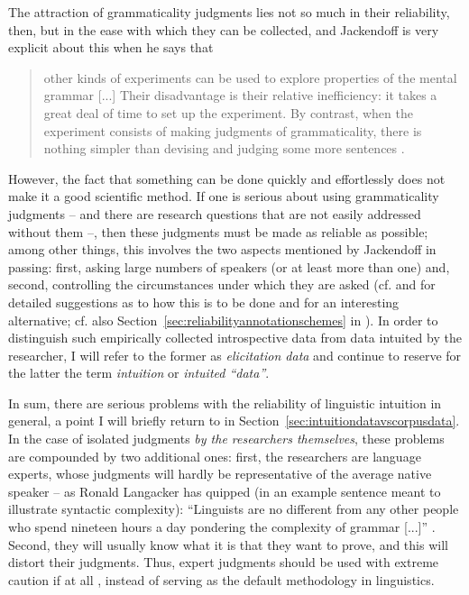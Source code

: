 The attraction of grammaticality judgments lies not so much in their reliability,  then, but in the ease with which they can be collected, and Jackendoff is very explicit about this when he says that

\begin{quote}
other kinds of experiments  can be used to explore properties of the mental grammar [...] Their disadvantage is their relative inefficiency: it takes a great deal of time to set up the experiment. By contrast, when the experiment consists of making judgments of grammaticality, there is nothing simpler than devising and judging some more sentences \citep[49]{jackendoff_patterns_1994}.
\end{quote}

However, the fact that something can be done quickly and effortlessly does not make it a good scientific method. If one is serious about using grammaticality  judgments -- and there are research questions that are not easily addressed without them --, then these judgments must be made as reliable  as possible; among other things, this involves the two aspects mentioned by Jackendoff in passing: first, asking large numbers of speakers (or at least more than one) and, second, controlling the circumstances under which they are asked (cf. \citealt{schutze_empirical_1996} and \citealt{cowart_experimental_1997} for detailed suggestions as to how this is to be done and \citealt{bender_boundaries_2005} for an interesting alternative; cf. also Section~\ref{sec:reliabilityannotationschemes} in ). In order to distinguish such empirically collected introspective  data from data intuited  by the researcher, I will refer to the former as \emph{elicitation  data} and continue to reserve for the latter the term \emph{intuition} or \emph{intuited ``data''}.

In sum, there are serious problems with the reliability  of linguistic intuition  in general, a point I will briefly return to in Section~\ref{sec:intuitiondatavscorpusdata}. In the case of isolated judgments \emph{by the researchers themselves}, these problems are compounded by two additional ones: first, the researchers are language experts, whose judgments will hardly be representative  of the average native speaker -- as Ronald Langacker has quipped (in an example sentence meant to illustrate syntactic complexity): ``Linguists are no different from any other people who spend nineteen hours a day pondering the complexity of grammar [...]'' \citep[109]{langacker_language_1973}. Second, they will usually know what it is that they want to prove, and this will distort their judgments. Thus, expert judgments should be used with extreme caution \citep[cf.][]{labov_when_1996} if at all \citep{schutze_empirical_1996}, instead of serving as the default methodology in linguistics.

